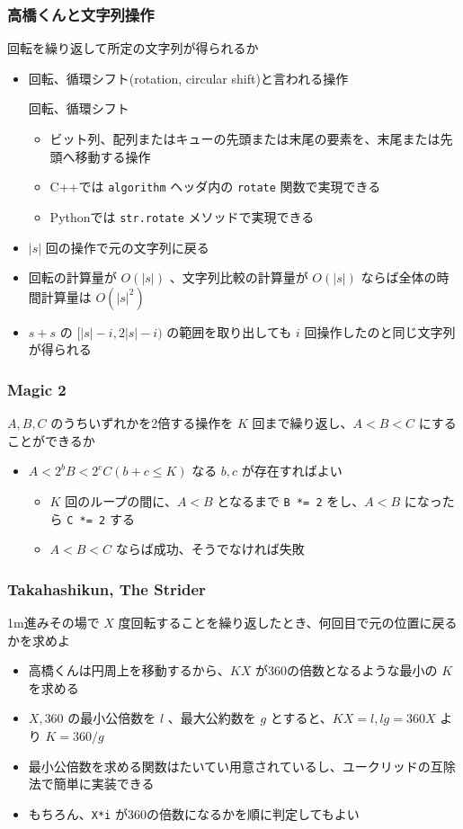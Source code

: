 \documentclass[t, aspectratio=169, dvipdfmx]{beamer}
\begin{document}
\begin{frame}[containsverbatim]
  \frametitle{高橋くんと文字列操作}
  回転を繰り返して所定の文字列が得られるか
  \begin{itemize}
    \item 回転、循環シフト(rotation, circular shift)と言われる操作
    \begin{term}{回転、循環シフト}
      \begin{itemize}
        \item ビット列、配列またはキューの先頭または末尾の要素を、末尾または先頭へ移動する操作
      \end{itemize}
    \end{term}
    \begin{itemize}
      \item C++では \verb|algorithm| ヘッダ内の \verb|rotate| 関数で実現できる
      \item Pythonでは \verb|str.rotate| メソッドで実現できる
    \end{itemize}
    \item $|s|$ 回の操作で元の文字列に戻る
    \item 回転の計算量が $O(|s|)$ 、文字列比較の計算量が $O(|s|)$ ならば全体の時間計算量は $O(|s|^2)$
    \item $s+s$ の $[|s|-i, 2|s|-i)$ の範囲を取り出しても $i$ 回操作したのと同じ文字列が得られる
  \end{itemize}
\end{frame}

\begin{frame}[containsverbatim]
  \frametitle{Magic 2}
  $A,B,C$ のうちいずれかを2倍する操作を $K$ 回まで繰り返し、$A<B<C$ にすることができるか
  \begin{itemize}
    \item $A < 2^b B < 2^c C (b+c \leq K)$ なる $b,c$ が存在すればよい
    \begin{itemize}
      \item $K$ 回のループの間に、$A<B$ となるまで \verb|B *= 2| をし、$A<B$ になったら \verb|C *= 2| する
      \item $A<B<C$ ならば成功、そうでなければ失敗
    \end{itemize}
  \end{itemize}
\end{frame}

\begin{frame}[containsverbatim]
  \frametitle{Takahashikun, The Strider}
  1m進みその場で $X$ 度回転することを繰り返したとき、何回目で元の位置に戻るかを求めよ
  \begin{itemize}
    \item 高橋くんは円周上を移動するから、$KX$ が360の倍数となるような最小の $K$ を求める
    \item $X,360$ の最小公倍数を $l$ 、最大公約数を $g$ とすると、$KX=l, lg=360X$ より $K=360/g$
    \item 最小公倍数を求める関数はたいてい用意されているし、ユークリッドの互除法で簡単に実装できる
    \item もちろん、\verb|X*i| が360の倍数になるかを順に判定してもよい
  \end{itemize}
\end{frame}
\end{document}
